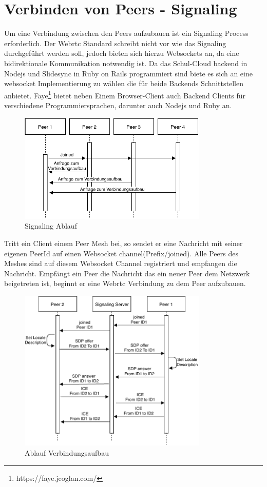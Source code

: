 \section{Verbinden von Peers - Signaling}
Um eine Verbindung zwischen den Peers aufzubauen ist ein Signaling Process erforderlich. Der Webrtc Standard schreibt nicht vor wie das Signaling durchgeführt werden soll, jedoch bieten sich hierzu Websockets an, da eine bidirektionale Kommunikation notwendig ist. Da das Schul-Cloud backend in Nodejs und Slidesync in Ruby on Rails programmiert sind biete es sich an eine websocket Implementierung zu wählen die für beide Backends Schnittstellen anbietet. Faye\footnote{https://faye.jcoglan.com/} bietet neben Einem Browser-Client auch Backend Clients für verschiedene Programmiersprachen, darunter auch Nodejs und Ruby an. 
\begin{figure}[!h]
	\centering
	\includegraphics[width=0.8\textwidth]{figures/Signaling}
	\caption[A Figure Short-Title]{Signaling Ablauf}
	\label{fig:mesh}
\end{figure}

Tritt ein Client einem Peer Mesh bei, so sendet er eine Nachricht mit seiner eigenen PeerId auf einen Websocket channel({Prefix}/joined). Alle Peers des Meshes sind auf diesem Websocket Channel registriert und empfangen die Nachricht. Empfängt ein Peer die Nachricht das ein neuer Peer dem Netzwerk beigetreten ist, beginnt er eine Webrtc Verbindung zu dem Peer aufzubauen.

\begin{figure}[!h]
	\centering
	\includegraphics[width=0.8\textwidth]{figures/Signaling-Webrtc}
	\caption[A Figure Short-Title]{Ablauf Verbindungsaufbau}
	\label{fig:signaling-connection}
\end{figure}

